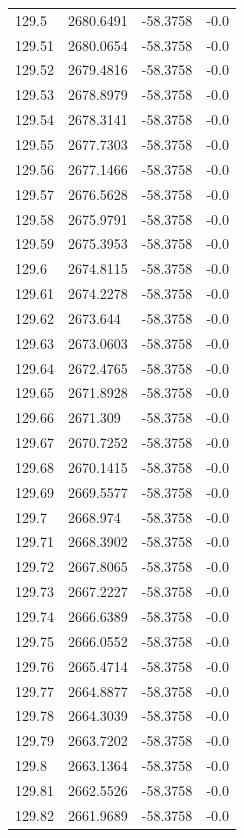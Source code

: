 \begin{table}[H]
\begin{tabular}{llll}
129.5 & 2680.6491 & -58.3758 & -0.0 \\
129.51 & 2680.0654 & -58.3758 & -0.0 \\
129.52 & 2679.4816 & -58.3758 & -0.0 \\
129.53 & 2678.8979 & -58.3758 & -0.0 \\
129.54 & 2678.3141 & -58.3758 & -0.0 \\
129.55 & 2677.7303 & -58.3758 & -0.0 \\
129.56 & 2677.1466 & -58.3758 & -0.0 \\
129.57 & 2676.5628 & -58.3758 & -0.0 \\
129.58 & 2675.9791 & -58.3758 & -0.0 \\
129.59 & 2675.3953 & -58.3758 & -0.0 \\
129.6 & 2674.8115 & -58.3758 & -0.0 \\
129.61 & 2674.2278 & -58.3758 & -0.0 \\
129.62 & 2673.644 & -58.3758 & -0.0 \\
129.63 & 2673.0603 & -58.3758 & -0.0 \\
129.64 & 2672.4765 & -58.3758 & -0.0 \\
129.65 & 2671.8928 & -58.3758 & -0.0 \\
129.66 & 2671.309 & -58.3758 & -0.0 \\
129.67 & 2670.7252 & -58.3758 & -0.0 \\
129.68 & 2670.1415 & -58.3758 & -0.0 \\
129.69 & 2669.5577 & -58.3758 & -0.0 \\
129.7 & 2668.974 & -58.3758 & -0.0 \\
129.71 & 2668.3902 & -58.3758 & -0.0 \\
129.72 & 2667.8065 & -58.3758 & -0.0 \\
129.73 & 2667.2227 & -58.3758 & -0.0 \\
129.74 & 2666.6389 & -58.3758 & -0.0 \\
129.75 & 2666.0552 & -58.3758 & -0.0 \\
129.76 & 2665.4714 & -58.3758 & -0.0 \\
129.77 & 2664.8877 & -58.3758 & -0.0 \\
129.78 & 2664.3039 & -58.3758 & -0.0 \\
129.79 & 2663.7202 & -58.3758 & -0.0 \\
129.8 & 2663.1364 & -58.3758 & -0.0 \\
129.81 & 2662.5526 & -58.3758 & -0.0 \\
129.82 & 2661.9689 & -58.3758 & -0.0 \\

\end{tabular}
\end{table}
